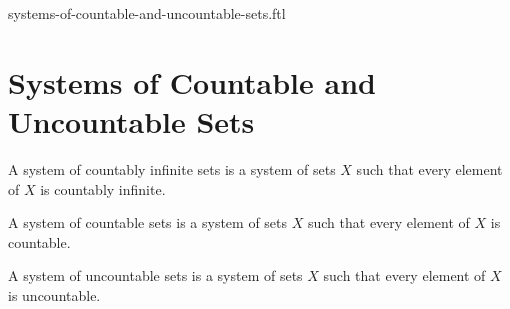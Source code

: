 \documentclass{naproche-library}
\begin{document}
\begin{smodule}{systems-of-countable-and-uncountable-sets.ftl}

  \section*{Systems of Countable and Uncountable Sets}

  \begin{definition}[forthel,id=FOUNDATIONS_14_3786392159125504,printid]
    A system of countably infinite sets is a system of sets $X$ such that every element of $X$ is countably infinite.
  \end{definition}

  \begin{definition}[forthel,id=FOUNDATIONS_14_7341152585908224,printid]
    A system of countable sets is a system of sets $X$ such that every element of $X$ is countable.
  \end{definition}

  \begin{definition}[forthel,id=FOUNDATIONS_14_6106935677943808,printid]
    A system of uncountable sets is a system of sets $X$ such that every element of $X$ is uncountable.
  \end{definition}
\end{smodule}
\end{document}
